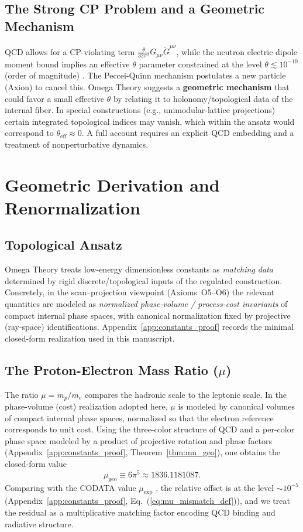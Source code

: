 \subsection{The Strong CP Problem and a Geometric Mechanism}
QCD allows for a CP-violating term $\frac{\theta}{32\pi^2} G_{\mu\nu} \tilde{G}^{\mu\nu}$, while the neutron electric dipole moment bound implies an effective $\theta$ parameter constrained at the level $\theta \lesssim 10^{-10}$ (order of magnitude) \cite{Abel2020NeutronEDM}. The Peccei-Quinn mechanism postulates a new particle (Axion) to cancel this.
Omega Theory suggests a \textbf{geometric mechanism} that could favor a small effective $\theta$ by relating it to holonomy/topological data of the internal fiber. In special constructions (e.g., unimodular-lattice projections) certain integrated topological indices may vanish, which within the ansatz would correspond to $\theta_{\mathrm{eff}}\approx 0$. A full account requires an explicit QCD embedding and a treatment of nonperturbative dynamics.

\section{Geometric Derivation and Renormalization}
\label{chap:constants}

\subsection{Topological Ansatz}
Omega Theory treats low-energy dimensionless constants as \emph{matching data} determined by rigid discrete/topological inputs of the regulated construction. Concretely, in the scan--projection viewpoint (Axioms~O5--O6) the relevant quantities are modeled as \emph{normalized phase-volume / process-cost invariants} of compact internal phase spaces, with canonical normalization fixed by projective (ray-space) identifications. Appendix~\ref{app:constants_proof} records the minimal closed-form realization used in this manuscript.

\subsection{The Proton-Electron Mass Ratio \texorpdfstring{($\mu$)}{(mu)}}
The ratio $\mu=m_p/m_e$ compares the hadronic scale to the leptonic scale. In the phase-volume (cost) realization adopted here, $\mu$ is modeled by canonical volumes of compact internal phase spaces, normalized so that the electron reference corresponds to unit cost. Using the three-color structure of QCD and a per-color phase space modeled by a product of projective rotation and phase factors (Appendix~\ref{app:constants_proof}, Theorem~\ref{thm:mu_geo}), one obtains the closed-form value
\begin{equation}
\label{eq:mu_geo}
    \mu_{\text{geo}} \equiv 6\pi^5 \approx 1836.1181087.
\end{equation}
Comparing with the CODATA value $\mu_{\mathrm{exp}}$ \cite{CODATA2022RMP}, the relative offset is at the level $\sim 10^{-5}$ (Appendix~\ref{app:constants_proof}, Eq.~(\ref{eq:mu_mismatch_def})), and we treat the residual as a multiplicative matching factor encoding QCD binding and radiative structure.


